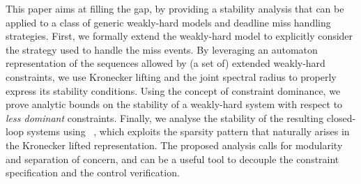 This paper aims at filling the gap, by providing a stability analysis that can be applied to a class of generic weakly-hard models and deadline miss handling strategies.
First, we formally extend the weakly-hard model to explicitly consider the strategy used to handle the miss events. 
By leveraging an automaton representation of the sequences allowed by (a set of) extended weakly-hard constraints, we use Kronecker lifting and the joint spectral radius to properly express its stability conditions.
Using the concept of constraint dominance, we prove analytic bounds on the stability of a weakly-hard system with respect to \emph{less dominant} constraints.
Finally, we analyse the stability of the resulting closed-loop systems using ~\cite{sparsejsr}, which exploits the sparsity pattern that naturally arises in the Kronecker lifted representation.
The proposed analysis calls for modularity and separation of concern, and can be a useful tool to decouple the constraint specification and the control verification.
